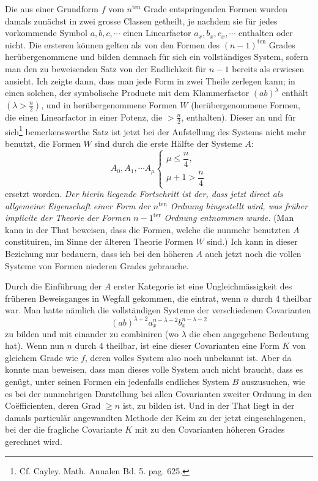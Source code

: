 \documentclass[10pt]{article}
\providecommand{\bdots}{\cdots}
\begin{document}
Die aus einer Grundform $f$ vom $n^{\mathrm{ten}}$ Grade entspringenden Formen wurden damals zunächst in zwei grosse Classen getheilt, je nachdem sie für jedes vorkommende Symbol $a,b,c,\cdots$ einen Linearfactor $a_x,b_x,c_x,\cdots$ enthalten oder nicht. Die ersteren können gelten als von den Formen des $(n-1)^{\mathrm{ten}}$ Grades herübergenommene und bilden demnach für sich ein vollständiges System, sofern man den zu beweisenden Satz von der Endlichkeit für $n-1$ bereits als erwiesen ansieht. Ich zeigte dann, dass man jede Form in zwei Theile zerlegen kann; in einen solchen, der symbolische Producte mit dem Klammerfactor $(ab)^\lambda$ enthält $(\lambda>\frac n2)$, und in herübergenommene Formen $W$ (herübergenommene Formen, die einen Linearfactor in einer Potenz, die $>\frac n2$, enthalten). Dieser an und für sich\footnote{Cf. Cayley. Math. Annalen Bd. 5. pag. 625.} bemerkenswerthe Satz ist jetzt bei der Aufstellung des Systems nicht mehr benutzt, die Formen $W$ sind durch die erste Hälfte der Systeme $A$:
\[
A_0,A_1,\bdots A_\mu
\left\{
\begin{array}{l}
\mu\leq\dfrac n4,\\
\mu+1>\dfrac n4
\end{array}
\right.
\]
ersetzt worden. \textit{Der hierin liegende Fortschritt ist der, dass jetzt direct als allgemeine Eigenschaft einer Form der $n^{\mathrm{ten}}$ Ordnung hingestellt wird, was früher implicite der Theorie der Formen $n-1^{\mathrm{ter}}$ Ordnung entnommen wurde.} (Man kann in der That beweisen, dass die Formen, welche die nunmehr benutzten $A$ constituiren, im Sinne der älteren Theorie Formen $W$ sind.) Ich kann in dieser Beziehung nur bedauern, dass ich bei den höheren $A$ auch jetzt noch die vollen Systeme von Formen niederen Grades gebrauche.

Durch die Einführung der $A$ erster Kategorie ist eine Ungleichmässigkeit des früheren Beweisganges in Wegfall gekommen, die eintrat, wenn $n$ durch 4 theilbar war. Man hatte nämlich die vollständigen Systeme der verschiedenen Covarianten
\[
(ab)^{\lambda+2}a_x^{n-\lambda-2}b_x^{n-\lambda-2}
\]
zu bilden und mit einander zu combiniren (wo $\lambda$ die eben angegebene Bedeutung hat). Wenn nun $n$ durch 4 theilbar, ist eine dieser Covarianten eine Form $K$ von gleichem Grade wie $f$, deren volles System also noch unbekannt ist. Aber da konnte man beweisen, dass man dieses volle System auch nicht braucht, dass es genügt, unter seinen Formen ein jedenfalls endliches System $B$ auszusuchen, wie es bei der nunmehrigen Darstellung bei allen Covarianten zweiter Ordnung in den Coëfficienten, deren Grad $\geq n$ ist, zu bilden ist. Und in der That liegt in der damals particulär angewandten Methode der Keim zu der jetzt eingeschlagenen, bei der die fragliche Covariante $K$ mit zu den Covarianten höheren Grades gerechnet wird.
\end{document}
